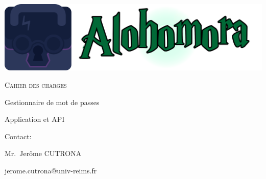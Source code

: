 \documentclass[oneside]{report}
\author{Sylvain COMBRAQUE, Sarah LAMOTTE, Nathan JANCZEWSKI, Léo BERGEROT}
\begin{document}
	\begin{titlepage}
		\centering
		\includegraphics[scale=.125]{logo_large}
		\vspace{5cm}
		{\par\scshape\Huge Cahier des charges\par}
		\vspace{5cm}
		{\par Gestionnaire de mot de passes\par}
		{\par Application et API\par}
		\vfill
		\par Contact:
		{\par\small Mr.\ Jerôme CUTRONA \par}
		\par jerome.cutrona@univ-reims.fr\
	\end{titlepage}

	\pagestyle{fancy}
	\fancyhf{}
	\tableofcontents
\end{document}

